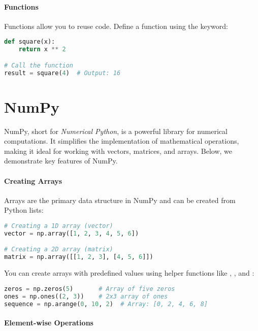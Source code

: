 \paragraph*{Functions}

Functions allow you to reuse code. Define a function using the  keyword:

\begin{lstlisting}[language=Python, style=mystyle2]
def square(x):
    return x ** 2

# Call the function
result = square(4)  # Output: 16
\end{lstlisting}

\section*{NumPy}

NumPy, short for \textit{Numerical Python}, is a powerful library for numerical computations. It simplifies the implementation of mathematical operations, making it ideal for working with vectors, matrices, and arrays. Below, we demonstrate key features of NumPy.

\paragraph*{Creating Arrays}

Arrays are the primary data structure in NumPy and can be created from Python lists:

\begin{lstlisting}[language=Python, style=mystyle2]
# Creating a 1D array (vector)
vector = np.array([1, 2, 3, 4, 5, 6])

# Creating a 2D array (matrix)
matrix = np.array([[1, 2, 3], [4, 5, 6]])
\end{lstlisting}

You can create arrays with predefined values using helper functions like , , and :

\begin{lstlisting}[language=Python, style=mystyle2]
zeros = np.zeros(5)       # Array of five zeros
ones = np.ones((2, 3))    # 2x3 array of ones
sequence = np.arange(0, 10, 2)  # Array: [0, 2, 4, 6, 8]
\end{lstlisting}

\paragraph*{Element-wise Operations}

